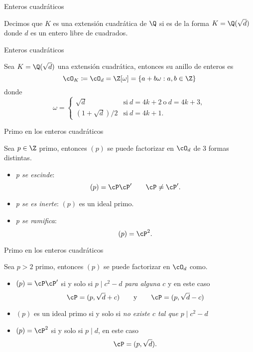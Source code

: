 \begin{frame}{Enteros cuadráticos}
  \begin{definition}
    Decimos que $K$ es una extensión cuadrática de $\Q$ si es de la forma $K = \Q(\sqrt{d})$ donde $d$ es un entero libre de cuadrados.
  \end{definition}
\end{frame}

\begin{frame}{Enteros cuadráticos}
  \begin{theorem}
    Sea $K = \Q(\sqrt{d})$ una extensión cuadrática, entonces su anillo de enteros es
    \[
      \cO_K \coloneqq \cO_d = \Z[\omega] = \{ a + b\omega : a,b \in \Z \} 
    \]
    donde
    \[
      \omega = \begin{cases}
        \sqrt{d} &\text{si} \ d = 4k+2 \ \text{o} \ d = 4k+3, \\
        (1+\sqrt{d})/2 &\text{si} \ d = 4k+1.
      \end{cases}
    \]
  \end{theorem}
\end{frame}


\begin{frame}{Primo en los enteros cuadráticos}
  \begin{theorem}
    Sea $p \in \Z$ primo, entonces $(p)$ se puede factorizar en $\cO_d$ de 3 formas distintas.
    \pause\bigskip
    \begin{itemize}[<+->]
      \item \emph{p se escinde}:
        \[
          (p) = \cP\cP' \qquad \cP \neq \cP'.
        \]

      \item \emph{p se es inerte}: $(p)$ es un ideal primo.
      \bigskip

      \item \emph{p se ramifica}:
      \[
        (p) = \cP^2.
      \]
    \end{itemize}
  \end{theorem}
\end{frame}



\begin{frame}{Primo en los enteros cuadráticos}
  \begin{theorem}
    Sea $p > 2$ primo, entonces $(p)$ se puede factorizar en $\cO_d$ como.
    \pause\bigskip
    \begin{itemize}[<+->]
      \item $(p) = \cP\cP'$ si y solo si \emph{$p \mid c^2 - d$ para alguna $c$} y en este caso
      \[
        \cP = (p, \sqrt{d}+c) \Eqand \cP = (p, \sqrt{d} - c)
      \]

      \item $(p)$ es un ideal primo si y solo si \emph{no existe $c$ tal que $p \mid c^2 - d$}
      \bigskip

      \item $(p) = \cP^2$ si y solo si $p \mid d$, en este caso
      \[
        \cP = (p, \sqrt{d}).
      \]
    \end{itemize}
  \end{theorem}
\end{frame}


